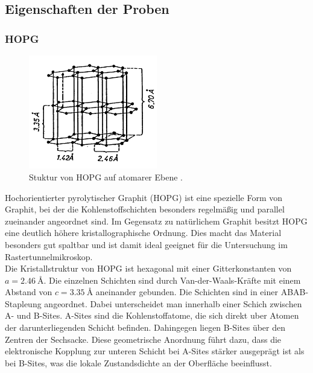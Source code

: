 \subsection{Eigenschaften der Proben}
\label{sec:EigenschaftenProben}

\subsubsection{HOPG}
\begin{figure}[h]
    \centering
    \includegraphics[width=0.5\textwidth]{Bilder/HOPGAufbau.png}
    \caption{Stuktur von HOPG auf atomarer Ebene \cite{ScanningTunnelingMicroscopy}.}
    \label{fig:HOPGAufbau}
\end{figure}
Hochorientierter pyrolytischer Graphit (HOPG) ist eine spezielle Form von Graphit, bei der die Kohlenstoffschichten besonders regelmäßig und parallel zueinander angeordnet sind. 
Im Gegensatz zu natürlichem Graphit besitzt HOPG eine deutlich höhere kristallographische Ordnung.
Dies macht das Material besonders gut spaltbar und ist damit ideal geeignet für die Untersuchung im Rastertunnelmikroskop.\\

Die Kristallstruktur von HOPG ist hexagonal mit einer Gitterkonstanten von $a = \SI{2.46}{\angstrom}$. 
Die einzelnen Schichten sind durch Van-der-Waals-Kräfte mit einem Abstand von $c = \SI{3.35}{\angstrom}$ aneinander gebunden. 
Die Schichten sind in einer ABAB-Stapleung angeordnet. Dabei unterscheidet man innerhalb einer Schich zwischen A- und B-Sites.
A-Sites sind die Kohlenstoffatome, die sich direkt uber Atomen der darunterliegenden Schicht befinden.
Dahingegen liegen B-Sites über den Zentren der Sechsacke.
Diese geometrische Anordnung führt dazu, dass die elektronische Kopplung zur unteren Schicht bei A-Sites stärker ausgeprägt ist als bei B-Sites, was die lokale Zustandsdichte an der Oberfläche beeinflusst.\\

